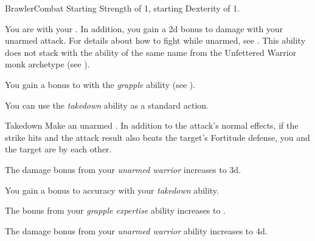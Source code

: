     \begin{feat}{Brawler}{Combat}
        \featpre Starting Strength of 1, starting Dexterity of 1.

         You are  with your .
        In addition, you gain a \plus2d bonus to damage with your unarmed attack.
        For details about how to fight while unarmed, see .
        This ability does not stack with the ability of the same name from the Unfettered Warrior monk archetype (see ).

         You gain a  bonus to  with the \textit{grapple} ability (see ).

         You can use the \textit{takedown} ability as a standard action.
        \begin{apability}{Takedown}
            Make an unarmed .
            In addition to the attack's normal effects, if the strike hits and the attack result also beats the target's Fortitude defense, you and the target are \grappled by each other.
        \end{apability}

         The damage bonus from your \textit{unarmed warrior} increases to \plus3d.

         You gain a  bonus to accuracy with your \textit{takedown} ability.

         The bonus from your \textit{grapple expertise} ability increases to .

         The damage bonus from your \textit{unarmed warrior} ability increases to \plus4d.
    \end{feat}

